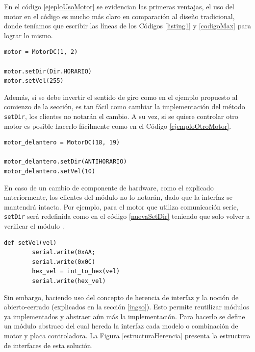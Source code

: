 En el código \ref{ejeploUsoMotor} se evidencian las primeras ventajas, el uso del motor en el código es mucho más claro en comparación al diseño tradicional, donde teníamos que escribir las líneas de los Códigos \ref{listing1} y \ref{codigoMax} para lograr lo mismo.

\begin{lstlisting}[caption=Ejemplo de uso de la interfaz del módulo MotorDC, label={ejeploUsoMotor}]
motor = MotorDC(1, 2)

motor.setDir(Dir.HORARIO)
motor.setVel(255)
\end{lstlisting}

Además, si se debe invertir el sentido de giro como en el ejemplo propuesto al comienzo de la sección, es tan fácil como cambiar la implementación del método \verb|setDir|, los clientes no notarán el cambio. A su vez, si se quiere controlar otro motor es posible hacerlo fácilmente como en el Código \ref{ejemploOtroMotor}. 

\begin{lstlisting}[caption=Ejemplo control nuevo motor DC.,label={ejemploOtroMotor}]
motor_delantero = MotorDC(18, 19)

motor_delantero.setDir(ANTIHORARIO)
motor_delantero.setVel(10)
\end{lstlisting}


En caso de un cambio de componente de hardware, como el explicado anteriormente, los clientes del módulo no lo notarán, dado que la interfaz se mantendrá intacta. Por ejemplo, para el motor que utiliza comunicación serie, \verb|setDir| será redefinida como en el código \ref{nuevaSetDir} teniendo que solo volver a verificar el módulo \MotorDC.

\begin{lstlisting}[caption=Implementación método setVel para el motor que utiliza comunicación serie.,label={nuevaSetDir}]
def setVel(vel)
        serial.write(0xAA;
        serial.write(0x0C)
        hex_vel = int_to_hex(vel)
        serial.write(hex_vel)
\end{lstlisting}

Sin embargo, haciendo uso del concepto de herencia de interfaz y la noción de abierto-cerrado (explicados en la sección \ref{ingso}). Esto permite reutilizar módulos ya implementados y abstraer aún más la implementación. Para hacerlo se define un módulo abstraco \textit{\MotorDC} del cual hereda la interfaz cada modelo o combinación de motor y placa controladora. La Figura \ref{estructuraHerencia} presenta la estructura de interfaces de esta solución.

